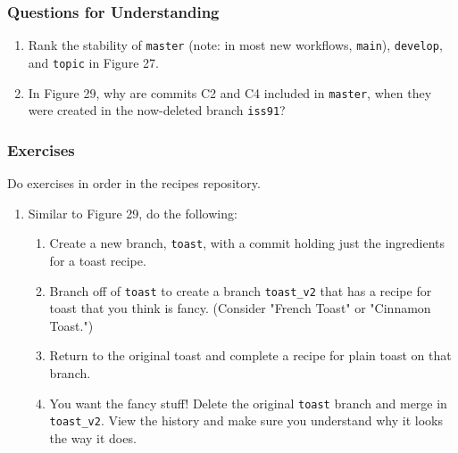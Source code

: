 \subsubsection{Questions for Understanding}
\begin{enumerate}
	\item Rank the stability of \verb`master` (note: in most new workflows,
	\verb`main`),
	   \verb`develop`, and \verb`topic` in Figure 27.
	\item In Figure 29, why are commits C2 and C4 included in \verb`master`, when they
	   were created in the now-deleted branch \verb`iss91`?
\end{enumerate}

\subsubsection{Exercises}
Do exercises in order in the recipes repository.
\begin{enumerate}
\item Similar to Figure 29, do the following:
   \begin{enumerate}
	   \item Create a new branch, \verb`toast`, with a commit holding just the
		  ingredients for a toast recipe.
	   \item Branch off of \verb`toast` to create a branch \verb`toast_v2` that has a recipe
		  for toast that you think is fancy.
		  (Consider "French Toast" or "Cinnamon Toast.")
	   \item Return to the original toast and complete a recipe for plain toast on
		  that branch.
	   \item You want the fancy stuff!
		  Delete the original \verb`toast` branch and merge in \verb`toast_v2`.
		  View the history and make sure you understand why it looks the way it
		  does.
    \end{enumerate}	
\end{enumerate}
